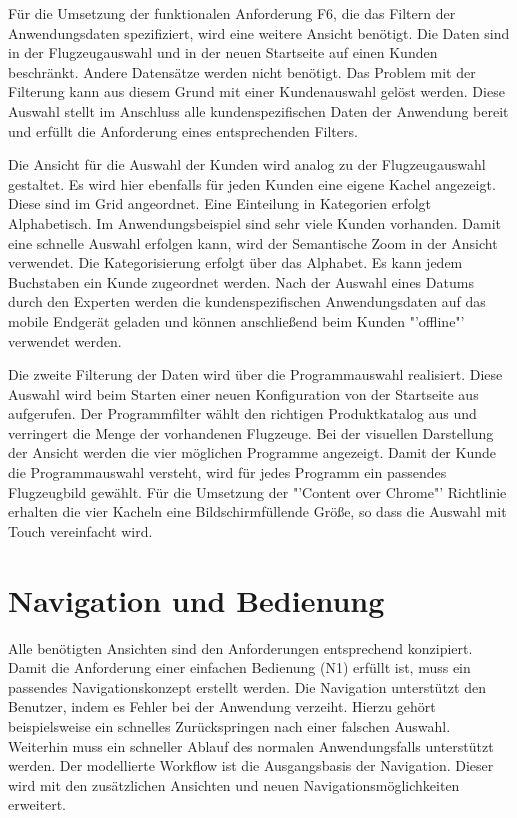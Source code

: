 Für die Umsetzung der funktionalen Anforderung F6, die das Filtern der Anwendungsdaten spezifiziert, wird eine weitere Ansicht benötigt. Die Daten sind in der Flugzeugauswahl und in der neuen Startseite auf einen Kunden beschränkt. Andere Datensätze werden nicht benötigt.  Das Problem mit der Filterung kann aus diesem Grund mit einer Kundenauswahl gelöst werden. Diese Auswahl stellt im Anschluss alle kundenspezifischen Daten der Anwendung bereit und erfüllt die Anforderung eines entsprechenden Filters. \par 

Die Ansicht für die Auswahl der Kunden wird analog zu der Flugzeugauswahl gestaltet. Es wird hier ebenfalls für jeden Kunden eine eigene Kachel angezeigt. Diese sind im Grid angeordnet. Eine Einteilung in Kategorien erfolgt Alphabetisch. Im Anwendungsbeispiel sind sehr viele Kunden vorhanden. Damit eine schnelle Auswahl erfolgen kann, wird der Semantische Zoom in der Ansicht verwendet. Die Kategorisierung erfolgt über das Alphabet. Es kann jedem Buchstaben ein Kunde zugeordnet werden. Nach der Auswahl eines Datums durch den Experten werden die kundenspezifischen Anwendungsdaten auf das mobile Endgerät geladen und können anschließend beim Kunden "'offline"' verwendet werden. \par 

Die zweite Filterung der Daten wird über die Programmauswahl realisiert. Diese Auswahl wird beim Starten einer neuen Konfiguration von der Startseite aus aufgerufen. Der Programmfilter wählt den richtigen Produktkatalog aus und verringert die Menge der vorhandenen Flugzeuge. Bei der visuellen Darstellung der Ansicht werden die vier möglichen Programme angezeigt. Damit der Kunde die Programmauswahl versteht, wird für jedes Programm ein passendes Flugzeugbild gewählt. Für die Umsetzung der "'Content over Chrome"' Richtlinie erhalten die vier Kacheln eine Bildschirmfüllende Größe, so dass die Auswahl mit Touch vereinfacht wird.


\section{Navigation und Bedienung}
Alle benötigten Ansichten sind den Anforderungen entsprechend konzipiert. Damit die Anforderung einer einfachen Bedienung (N1) erfüllt ist, muss ein passendes Navigationskonzept erstellt werden. Die Navigation unterstützt den Benutzer, indem es Fehler bei der Anwendung verzeiht. Hierzu gehört beispielsweise ein schnelles Zurückspringen nach einer falschen Auswahl. Weiterhin muss ein schneller Ablauf des normalen Anwendungsfalls unterstützt werden. Der modellierte Workflow ist die Ausgangsbasis der Navigation. Dieser wird mit den zusätzlichen Ansichten und neuen Navigationsmöglichkeiten erweitert. \par 

